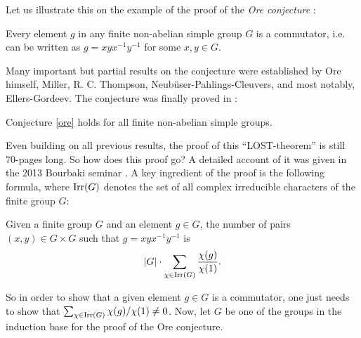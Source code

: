 Let us illustrate this on the example of the proof of the {\it Ore conjecture} \cite{O}:

\begin{conj}\label{ore}
Every element $g$ in any finite non-abelian simple group $G$ is a commutator,
i.e. can be written as $g = xyx^{-1}y^{-1}$ for some $x,y \in G$.
\end{conj}

Many important but partial results on the conjecture were established by Ore himself, Miller, R. C. Thompson, Neub\"user-Pahlings-Cleuvers, and most notably, Ellers-Gordeev. The conjecture was finally proved in \cite{LBST}:

\begin{thm}
Conjecture \ref{ore} holds for all finite non-abelian simple groups.
\end{thm}

Even building on all previous results, the proof of this ``LOST-theorem''
is still 70-pages long. So how does this proof go? A detailed account of it was given in the 2013 Bourbaki seminar \cite{M}.
A key ingredient of the proof is the following formula, where ${\mathrm {Irr}}(G)$ denotes the set of all complex irreducible characters of 
the finite group $G$:

\begin{lem}\label{frob}
Given a finite group $G$ and an element $g \in G$, the number of pairs $(x,y) \in G \times G$ such 
that $g = xyx^{-1}y^{-1}$ is 
$$|G| \cdot \sum_{\chi \in {\mathrm {Irr}}(G)}\frac{\chi(g)}{\chi(1)}.$$
\end{lem}

So in order to show that a given element $g \in G$ is a commutator, one just needs to show that 
$\sum_{\chi \in {\mathrm {Irr}}(G)}\chi(g)/\chi(1) \neq 0$. Now, let $G$ be one of the groups in the induction base for
the proof \cite{LBST} of the Ore conjecture. 

